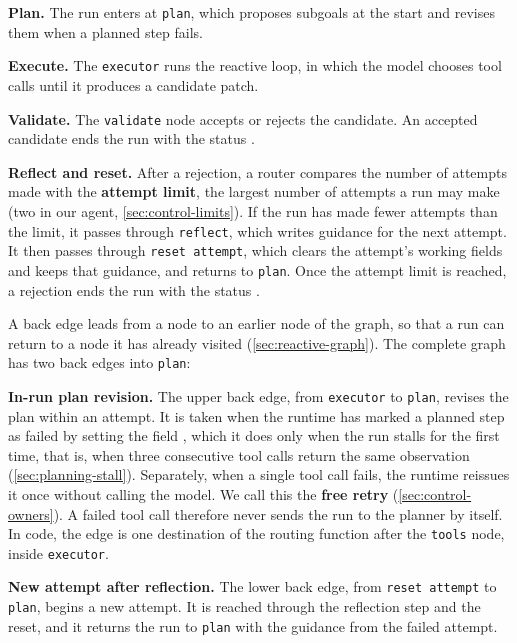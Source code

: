\bi
\item \textbf{Plan.} The run enters at \texttt{plan}, which proposes subgoals at the start and
revises them when a planned step fails.
\item \textbf{Execute.} The \texttt{executor} runs the reactive loop, in which the model chooses
tool calls until it produces a candidate patch.
\item \textbf{Validate.} The \texttt{validate} node accepts or rejects the candidate. An accepted
candidate ends the run with the status .
\item \textbf{Reflect and reset.} After a rejection, a router compares the number of attempts made
with the \textbf{attempt limit}, the largest number of attempts a run may make (two in our agent,
\cref{sec:control-limits}). If the run has made fewer attempts than the limit, it passes through
\texttt{reflect}, which writes guidance for the next attempt. It then passes through
\texttt{reset attempt}, which clears the attempt's working fields and keeps that guidance, and
returns to
\texttt{plan}. Once the attempt limit is reached, a rejection ends the run with the status
.
\ei

A back edge leads from a node to an earlier node of the graph, so that a run can return to a node
it has already visited (\cref{sec:reactive-graph}). The complete graph has two back edges into
\texttt{plan}:

\bi
\item \textbf{In-run plan revision.} The upper back edge, from \texttt{executor} to \texttt{plan},
revises the plan within an attempt. It is taken when the runtime has marked a planned step as
failed by setting the field , which it does only when the run stalls for the
first time, that is, when three consecutive tool calls return the same observation
(\cref{sec:planning-stall}). Separately, when a single tool call fails, the runtime reissues it once
without calling the model. We call this the \textbf{free retry} (\cref{sec:control-owners}). A
failed tool call therefore never sends the run to the planner by itself. In code, the edge is one destination of the routing function after
the \texttt{tools} node, inside \texttt{executor}.
\item \textbf{New attempt after reflection.} The lower back edge, from \texttt{reset attempt} to
\texttt{plan}, begins a new attempt. It is reached through the reflection step and the reset, and
it returns the run to \texttt{plan} with the guidance from the failed attempt.
\ei

